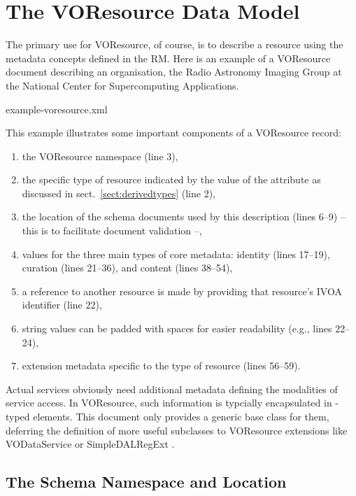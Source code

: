 \documentclass[11pt,a4paper]{ivoa}
\begin{document}
\section{The VOResource Data Model}
\label{sect:model}

The primary use for VOResource, of course, is to describe a resource
using the metadata concepts defined in the RM.  Here is an example of a
VOResource document describing an organisation, the Radio Astronomy
Imaging Group at the National Center for Supercomputing Applications.  


   {example-voresource.xml}

This example illustrates some important components of a VOResource
record:

\begin{enumerate}
  \item the VOResource namespace (line 3),
  \item the specific type of resource indicated by
       the value of the  attribute as
       discussed in sect.~\ref{sect:derivedtypes} (line 2),
  \item the location of the schema documents used by
       this description (lines 6--9) -- this is to facilitate document
       validation --,
  \item values for the three main types of core metadata:
       identity (lines 17--19), curation (lines 21--36), and content
       (lines 38--54),
  \item a reference to another resource is made by
       providing that resource's IVOA identifier (line 22),
  \item string values can be padded with spaces
       for easier readability (e.g., lines 22--24),
  \item extension metadata specific to the type of
       resource (lines 56--59).
\end{enumerate}

Actual services obviously need additional metadata defining the
modalities of service access. In VOResource, such information
is typcially encapsulated in -typed elements. This
document only provides a generic base class for them, deferring the
definition of more useful subclasses to VOResource extensions like
VODataService \citep{2010ivoa.spec.1202P} or SimpleDALRegExt
\citep{2013ivoa.spec.1125P}.


\subsection{The Schema Namespace and Location}
\end{document}
